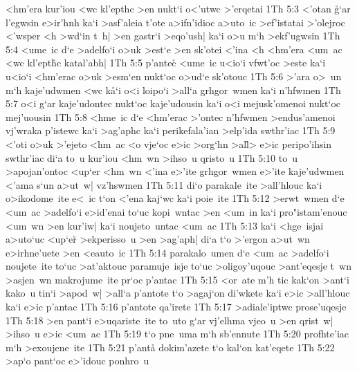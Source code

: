 <hm'era
kur'iou
<wc
kl'epthc
>en
nukt`i
o<'utwc
>'erqetai\bibvsend
\vs 1Th 5:3
<'otan
\r{g}`ar
l'egwsin
e>ir'hnh
ka`i
>asf'aleia
t'ote
a>ifn'idioc
a>uto~ic
>ef'istatai
>'olejroc
<'wsper
<h
>wd`in
t~h|
>en
gastr`i
>eqo'ush|
ka`i
o>u
m`h
>ekf'ugwsin\bibvsend
\vs 1Th 5:4
<ume~ic
d`e
>adelfo`i
o>uk
>est`e
>en
sk'otei
<'ina
<h
<hm'era
<um~ac
<wc
kl'ept\r{h}c
katal'abh|\bibvsend
\vs 1Th 5:5
p'ante\r{c}
<ume~ic
u<io`i
vfwt'oc
>este
ka`i
u<io`i
<hm'erac
o>uk
>esm`en
nukt`oc
o>ud`e
sk'otouc\bibvsend
\vs 1Th 5:6
>'ara
o>~un
m`h
kaje'udwmen
<wc
k\r{a}`i
o<i
loipo`i
>all`a
grhgor~wmen
ka`i
n'hfwmen\bibvsend
\vs 1Th 5:7
o<i
g`ar
kaje'udontec
nukt`oc
kaje'udousin
ka`i
o<i
mejusk'omenoi
nukt`oc
mej'uousin\bibvsend
\vs 1Th 5:8
<hme~ic
d`e
<hm'erac
>'ontec
n'hfwmen
>endus'amenoi
vj'wraka
p'istewc
ka`i
>ag'aphc
ka`i
perikefala'ian
>elp'ida
swthr'iac\bibvsend
\vs 1Th 5:9
<'oti
o>uk
>'ejeto
<hm~ac
<o
vje`oc
e>ic
>org`hn
>al\r{l}>
e>ic
peripo'ihsin
swthr'iac
di`a
to~u
kur'iou
<hm~wn
>ihso~u
qristo~u\bibvsend
\vs 1Th 5:10
to~u
>apojan'ontoc
<up`er
<hm~wn
<'ina
e>'ite
grhgor~wmen
e>'ite
kaje'udwmen
<'ama
s`un
a>ut~w|
vz'hswmen\bibvsend
\vs 1Th 5:11
di`o
parakale~ite
>all'hlouc
ka`i
o>ikodome~ite
e<~ic
t`on
<'ena
kaj`wc
ka`i
poie~ite\bibvsend
\vs 1Th 5:12
>erwt~wmen
d`e
<um~ac
>adelfo`i
e>id'enai
to`uc
kopi~wntac
>en
<um~in
ka`i
pro"istam'enouc
<um~wn
>en
kur'iw|
ka`i
noujeto~untac
<um~ac\bibvsend
\vs 1Th 5:13
ka`i
<hge~isjai
a>uto`uc
<up`er\r{}
>ekperisso~u
>en
>ag'aph|
di`a
t`o
>'ergon
a>ut~wn
e>irhne'uete
>en
<eauto~ic\bibvsend
\vs 1Th 5:14
parakalo~umen
d`e
<um~ac
>adelfo`i
noujete~ite
to`uc
>at'aktouc
paramuje~isje
to`uc
>oligoy'uqouc
>ant'eqesje
t~wn
>asjen~wn
makrojume~ite
pr`oc
p'antac\bibvsend
\vs 1Th 5:15
<or~ate
m'h
tic
kak`on
>ant`i
kako~u
tin`i
>apod~w|
>all`a
p'antote
t`o
>agaj`on
di'wkete
ka`i
e>ic
>all'hlouc
ka`i
e>ic
p'antac\bibvsend
\vs 1Th 5:16
p'antote
qa'irete\bibvsend
\vs 1Th 5:17
>adiale'iptwc
prose'uqesje\bibvsend
\vs 1Th 5:18
>en
pant`i
e>uqariste~ite
to~uto
g`ar
vj'elhma
vjeo~u
>en
qrist~w|
>ihso~u
e>ic
<um~ac\bibvsend
\vs 1Th 5:19
t`o
pne~uma
m`h
sb'ennute\bibvsend
\vs 1Th 5:20
profhte'iac
m`h
>exoujene~ite\bibvsend
\vs 1Th 5:21
p'ant\r{a}
dokim'azete
t`o
kal`on
kat'eqete\bibvsend
\vs 1Th 5:22
>ap`o
pant`oc
e>'idouc
ponhro~u
